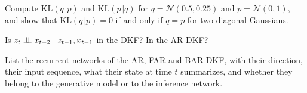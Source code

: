 \begin{notechapter}
\begin{exercise}\label{dkf:exr:4}
Compute $\mathrm{KL}(q\Vert p)$ and $\mathrm{KL}(p\Vert q)$ for $q = \mathcal N(0.5, 0.25)$ and $p = \mathcal N(0, 1)$, and show that
$\mathrm{KL}(q\Vert p) = 0$ if and only if $q = p$ for two diagonal Gaussians.
\end{exercise}

\begin{exercise}\label{dkf:exr:5}
Is $z_t\mathrel{\perp\!\!\!\perp} x_{t-2}\mid z_{t-1}, x_{t-1}$ in the DKF? In the AR DKF?
\end{exercise}

\begin{exercise}\label{dkf:exr:6}
List the recurrent networks of the AR, FAR and BAR DKF, with their direction, their input
sequence, what their state at time $t$ summarizes, and whether they belong to the generative
model or to the inference network.
\end{exercise}
\end{notechapter}
